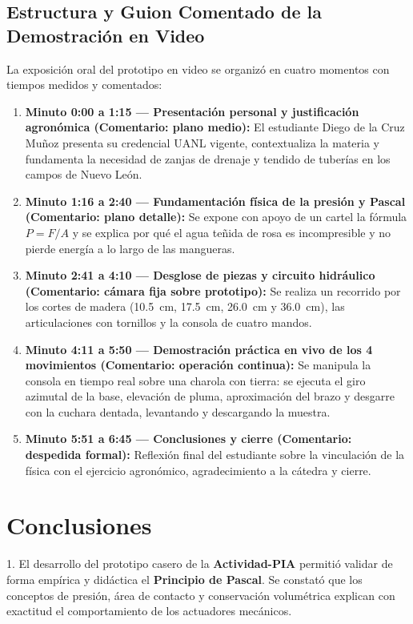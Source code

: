 \subsection{Estructura y Guion Comentado de la Demostración en Video}
La exposición oral del prototipo en video se organizó en cuatro momentos con tiempos medidos y comentados:
\begin{enumerate}
    \item \textbf{Minuto 0:00 a 1:15 --- Presentación personal y justificación agronómica (Comentario: plano medio):} El estudiante Diego de la Cruz Muñoz presenta su credencial UANL vigente, contextualiza la materia y fundamenta la necesidad de zanjas de drenaje y tendido de tuberías en los campos de Nuevo León.
    \item \textbf{Minuto 1:16 a 2:40 --- Fundamentación física de la presión y Pascal (Comentario: plano detalle):} Se expone con apoyo de un cartel la fórmula $P = F/A$ y se explica por qué el agua teñida de rosa es incompresible y no pierde energía a lo largo de las mangueras.
    \item \textbf{Minuto 2:41 a 4:10 --- Desglose de piezas y circuito hidráulico (Comentario: cámara fija sobre prototipo):} Se realiza un recorrido por los cortes de madera (\SI{10.5}{cm}, \SI{17.5}{cm}, \SI{26.0}{cm} y \SI{36.0}{cm}), las articulaciones con tornillos y la consola de cuatro mandos.
    \item \textbf{Minuto 4:11 a 5:50 --- Demostración práctica en vivo de los 4 movimientos (Comentario: operación continua):} Se manipula la consola en tiempo real sobre una charola con tierra: se ejecuta el giro azimutal de la base, elevación de pluma, aproximación del brazo y desgarre con la cuchara dentada, levantando y descargando la muestra.
    \item \textbf{Minuto 5:51 a 6:45 --- Conclusiones y cierre (Comentario: despedida formal):} Reflexión final del estudiante sobre la vinculación de la física con el ejercicio agronómico, agradecimiento a la cátedra y cierre.
\end{enumerate}

\section{Conclusiones}
1. El desarrollo del prototipo casero de la \textbf{Actividad-PIA} permitió validar de forma empírica y didáctica el \textbf{Principio de Pascal}. Se constató que los conceptos de presión, área de contacto y conservación volumétrica explican con exactitud el comportamiento de los actuadores mecánicos.

